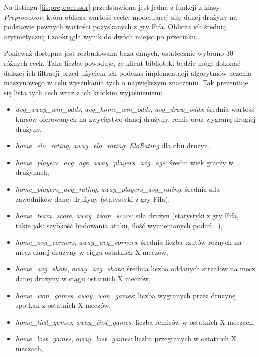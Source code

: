         Na listingu \ref{lis:preprocessor} przedstawiona jest jedna z funkcji z klasy \emph{Preprocessor}, która oblicza wartość cechy modelującej siłę danej drużyny na podstawie pewnych wartości pozyskanych z gry Fifa. Oblicza ich średnią arytmetyczną i zaokrągla wynik do dwóch miejsc po przecinku.
        
        Ponieważ dostępna jest rozbudowana baza danych, ostatecznie wybrano 30 różnych cech. Taka liczba powoduje, że klient biblioteki będzie mógł dokonać dalszej ich filtracji przed użyciem ich podczas implementacji algorytmów uczenia maszynowego w celu wyszukania tych o największym znaczeniu. Tak prezentuje się lista tych cech wraz z ich krótkim wyjaśnieniem:
        
        \begin{itemize}
            \item \emph{avg\_away\_win\_odds}, \emph{avg\_home\_win\_odds}, \emph{avg\_draw\_odds}: średnia wartość kursów oferowanych na zwycięstwo danej drużyny, remis oraz wygraną drugiej drużyny,
            \item \emph{home\_elo\_rating}, \emph{away\_elo\_rating}: \emph{EloRating} dla obu drużyn,
            \item \emph{home\_players\_avg\_age}, \emph{away\_players\_avg\_age}: średni wiek graczy w drużynach, 
            \item \emph{home\_players\_avg\_rating}, \emph{away\_players\_avg\_rating}: średnia siła zawodników danej drużyny (statystyki z gry Fifa), 
            \item \emph{home\_team\_score}, \emph{away\_team\_score}: siła drużyn (statystyki z gry Fifa, takie jak: szybkość budowania ataku, ilość wymienianych podań...), 
            \item \emph{home\_avg\_corners}, \emph{away\_avg\_corners}: średnia liczba rzutów rożnych na mecz danej drużyny w ciągu ostatnich X meczów, 
            \item \emph{home\_avg\_shots}, \emph{away\_avg\_shots}: średnia liczba oddanych strzałów na mecz danej drużyny w ciągu ostatnich X meczów, 
            \item \emph{home\_won\_games}, \emph{away\_won\_games}: liczba wygranych przez drużynę spotkań z ostatnich X meczów, 
            \item \emph{home\_tied\_games}, \emph{away\_tied\_games}: liczba remisów w ostatnich X meczach, 
            \item \emph{home\_lost\_games}, \emph{away\_lost\_games}: liczba przegranych w ostatnich X meczach, 

\end{itemize}
